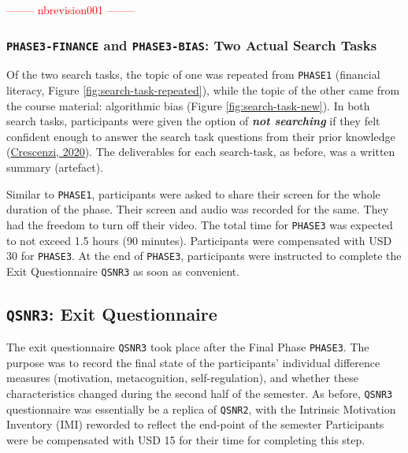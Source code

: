 \documentclass[letterpaper, nobind]{templates/ociamthesis}
\begin{document}
\textcolor{red}{-------- nbrevision001 --------}

\hypertarget{phase3-finance-and-phase3-bias-two-actual-search-tasks}{%
\subsubsection{\texorpdfstring{\texttt{PHASE3-FINANCE} and \texttt{PHASE3-BIAS}: Two Actual Search Tasks}{PHASE3-FINANCE and PHASE3-BIAS: Two Actual Search Tasks}}\label{phase3-finance-and-phase3-bias-two-actual-search-tasks}}

Of the two search tasks, the topic of one was repeated from \texttt{PHASE1} (financial literacy, Figure \ref{fig:search-task-repeated}), while the topic of the other came from the course material: algorithmic bias (Figure \ref{fig:search-task-new}).
In both search tasks, participants were given the option of \textbf{\emph{not searching}} if they felt confident enough to answer the search task questions from their prior knowledge (\protect\hyperlink{ref-crescenzi2020adaptation}{Crescenzi, 2020}).
The deliverables for each search-task, as before, was a written summary (artefact).

Similar to \texttt{PHASE1}, participants were asked to share their screen for the whole duration of the phase.
Their screen and audio was recorded for the same. They had the freedom to turn off their video. The total time for \texttt{PHASE3} was expected to not exceed 1.5 hours (90 minutes).
Participants were compensated with USD 30 for \texttt{PHASE3}.
At the end of \texttt{PHASE3}, participants were instructed to complete the Exit Questionnaire \texttt{QSNR3} as soon as convenient.

\hypertarget{sec-method-qsnr3}{%
\subsection{\texorpdfstring{\texttt{QSNR3}: Exit Questionnaire}{QSNR3: Exit Questionnaire}}\label{sec-method-qsnr3}}

The exit questionnaire \texttt{QSNR3} took place after the Final Phase \texttt{PHASE3}.
The purpose was to record the final state of the participants' individual difference measures (motivation, metacognition, self-regulation), and whether these characteristics changed during the second half of the semester.
As before, \texttt{QSNR3} questionnaire was essentially be a replica of \texttt{QSNR2}, with the Intrinsic Motivation Inventory (IMI) reworded to reflect the end-point of the semester
Participants were be compensated with USD 15 for their time for completing this step.
\end{document}
